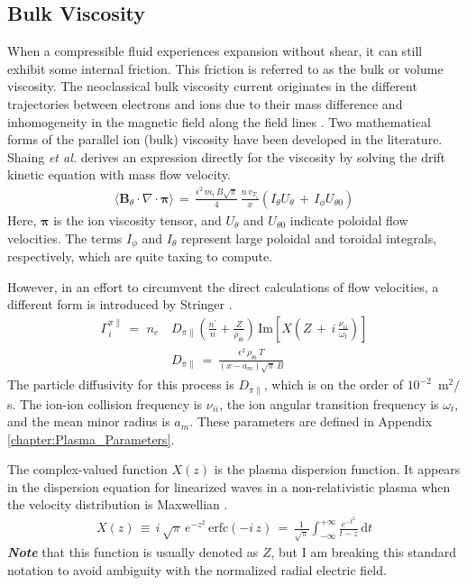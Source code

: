 \subsection{Bulk Viscosity}\label{ssec:bulk_viscosity}
When a compressible fluid experiences expansion without shear, it can still exhibit some internal friction.
This friction is referred to as the bulk or volume viscosity.
The neoclassical bulk viscosity current originates in the different trajectories between electrons and ions due to their mass difference and inhomogeneity in the magnetic field along the field lines \cite{kobayashi_model_2017}.
Two mathematical forms of the parallel ion (bulk) viscosity have been developed in the literature.
Shaing \emph{et al.} \cite{shaing_bifurcation_1990} derives an expression directly for the viscosity by solving the drift kinetic equation with mass flow velocity.
\begin{align}%
	\langle \mathbf{B}_\theta \cdot \nabla \cdot \boldsymbol{\pi} \rangle \,=\,
		\frac{\epsilon^2 \, m_i \, B \sqrt{\pi}}{4} \, \frac{n\,v_{T_i}}{x}
		\left(I_\theta U_\theta \,+\, I_\phi U_{\theta 0}\right)
		\label{eq:shaing_bulk}
\end{align}
Here, $\boldsymbol{\pi}$ is the ion viscosity tensor, and $U_\theta$ and $U_{\theta 0}$ indicate poloidal flow velocities.
The terms $I_\phi$ and $I_\theta$ represent large poloidal and toroidal integrals, respectively, which are quite taxing to compute.

However, in an effort to circumvent the direct calculations of flow velocities, a different form is introduced by Stringer \cite{stringer_explanation_1993}.
\begin{align} %
	\Gamma_i^{\pi\parallel} \,=\, \,n_e\,&D_{\pi\parallel}
		\left(\frac{n^\prime}{n} + \frac{Z}{\rho_{\theta i}}\right) \,
		\text{Im}\left[X\left(Z \,+\, i\,\frac{\nu_{ii}}{\omega_t}\right)\right]
		\label{eq:stringer_Gamma_bulk} \\
	&D_{\pi\parallel} \,=\, \frac{\epsilon^2\,\rho_{\theta i}\,T}
		{(x - a_m)\sqrt{\pi}\,B} \label{eq:stringer_D_bulk}
\end{align}
The particle diffusivity for this process is $D_{\pi\parallel}$, which is on the order of $10^{-2}$~m$^2 / $s.
The ion-ion collision frequency is $\nu_{ii}$, the ion angular transition frequency is $\omega_t$, and the mean minor radius is $a_m$.
These parameters are defined in Appendix \ref{chapter:Plasma_Parameters}.

The complex-valued function $X(z)$ is the plasma dispersion function.
It appears in the dispersion equation for linearized waves in a non-relativistic plasma when the velocity distribution is Maxwellian \cite{fried_plasma_2015}.
\begin{align} %
	X(z) \,\equiv\, i\,\sqrt{\pi} \, e^{-z^2} \, \text{erfc}(-i\,z) \,=\,
		\frac{1}{\sqrt{\pi}} \int_{-\infty}^{+\infty} \frac{e^{-t^2}}{t - z}
		\, \text{d}t \label{eq:plasma_disp}
\end{align}
\emph{\textbf{Note}} that this function is usually denoted as $Z$, but I am breaking this standard notation to avoid ambiguity with the normalized radial electric field.

